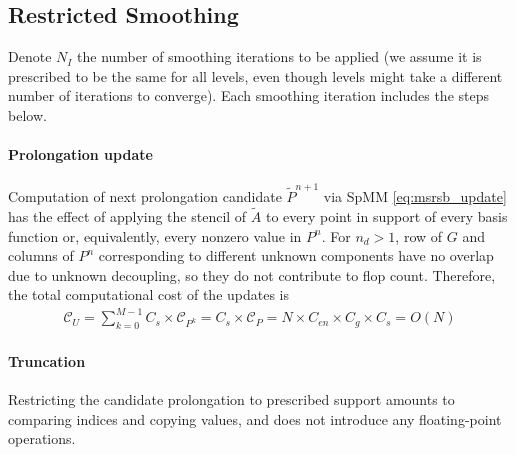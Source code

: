 \subsection{Restricted Smoothing}

Denote $N_I$ the number of smoothing iterations to be applied (we assume it is prescribed to be the same for all levels, even though levels might take a different number of iterations to converge).   Each smoothing iteration includes the steps below.

\paragraph{Prolongation update}
Computation of next prolongation candidate $\widetilde{P}^{n+1}$ via SpMM \cref{eq:msrsb_update} has the effect of applying the stencil of $\widetilde{A}$ to every point in support of every basis function or, equivalently, every nonzero value in $P^n$.   For $n_d > 1$, row of $G$ and columns of $P^n$ corresponding to different unknown components have no overlap due to unknown decoupling, so they do not contribute to flop count.   Therefore, the total computational cost of the updates is
\begin{align}
    \mathcal{C}_{U} = \sum\limits_{k=0}^{M-1} C_s \times \mathcal{C}_{P^k} = C_s \times \mathcal{C}_P = N \times C_{en} \times C_g \times C_s = O(N) \label{eq:complexity_update}
\end{align}

\paragraph{Truncation}
Restricting the candidate prolongation to prescribed support amounts to comparing indices and copying values, and does not introduce any floating-point operations.

